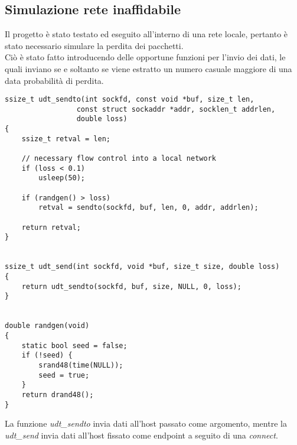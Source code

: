\subsection{Simulazione rete inaffidabile}
Il progetto è stato testato ed eseguito all'interno di una rete locale, 
pertanto è stato necessario simulare la perdita dei pacchetti.\\
Ciò è stato fatto introducendo delle opportune funzioni per l'invio dei dati,
le quali inviano se e soltanto se viene estratto un numero casuale maggiore 
di una data probabilità di perdita.

\begin{lstlisting}[title=simul\_udt.c]
ssize_t udt_sendto(int sockfd, const void *buf, size_t len, 
				 const struct sockaddr *addr, socklen_t addrlen,
				 double loss)
{
	ssize_t retval = len;

	// necessary flow control into a local network
	if (loss < 0.1)
		usleep(50);

	if (randgen() > loss) 
		retval = sendto(sockfd, buf, len, 0, addr, addrlen);

	return retval;
}


ssize_t udt_send(int sockfd, void *buf, size_t size, double loss)
{
	return udt_sendto(sockfd, buf, size, NULL, 0, loss);
}


double randgen(void)
{
	static bool seed = false;
	if (!seed) {
		srand48(time(NULL));
		seed = true;
	}
	return drand48();
}
\end{lstlisting}
La funzione \emph{udt\_sendto} invia dati all'host passato come argomento,
mentre la \emph{udt\_send} invia dati all'host fissato come endpoint a 
seguito di una \emph{connect}.
